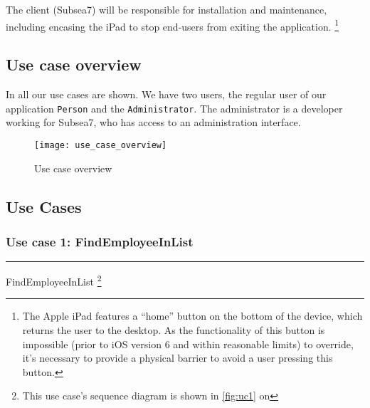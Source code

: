The client (Subsea7) will be responsible for installation and
maintenance, including encasing the iPad to stop end-users from
exiting the application. \footnote{The Apple iPad features a ``home''
  button on the bottom of the device, which returns the user to the
  desktop.  As the functionality of this button is impossible (prior to iOS version 6 and within
  reasonable limits) to override, it's necessary to provide a physical
  barrier to avoid a user pressing this button.}

\subsection{Use case overview}

In  all our use cases are shown. We have two
users, the regular user of our application \texttt{Person} and the
\texttt{Administrator}. The administrator is a developer working for
Subsea7, who has access to an administration interface.

\begin{figure}[!h]
    \centerline{\texttt{[image: use\_case\_overview]}}
    \caption{Use case overview}
    \label{fig:ucoverview}
\end{figure}

\clearpage

%
%
\newcommand{\usecaseline}{\vspace*{-6pt} \noindent
  \rule[0.5ex]{1\columnwidth}{1pt} \vspace*{-16pt}}
\newcommand{\usecasethickline}{\vspace*{-6pt} \noindent
  \rule[0.5ex]{1\columnwidth}{1.5pt} \vspace*{-16pt}}

\subsection{Use Cases} \label{sec:usecases}

\subsubsection{Use case 1: FindEmployeeInList}

\usecasethickline

\begin{description}[style=multiline,leftmargin=4cm,font=\normalfont]
\item[\emph{Use case name:}] FindEmployeeInList \footnote{This use
    case's sequence diagram is shown in \autoref{fig:uc1} on
    }
\end{description}

